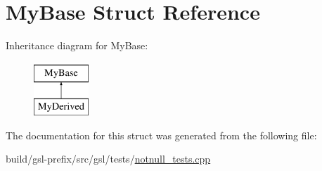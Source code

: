 \hypertarget{structMyBase}{}\section{My\+Base Struct Reference}
\label{structMyBase}
Inheritance diagram for My\+Base\+:\begin{figure}[H]
\begin{center}
\leavevmode
\includegraphics[height=2.000000cm]{structMyBase}
\end{center}
\end{figure}


The documentation for this struct was generated from the following file\+:\begin{DoxyCompactItemize}
\item 
build/gsl-\/prefix/src/gsl/tests/\hyperlink{notnull__tests_8cpp}{notnull\+\_\+tests.\+cpp}\end{DoxyCompactItemize}
